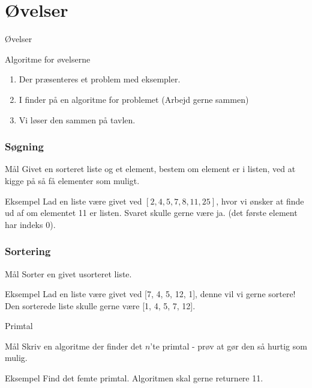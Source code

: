 \documentclass[12pt,t]{beamer}
\begin{document}
\section{Øvelser}
        \begin{frame}[t]{Øvelser}
            \begin{block}{Algoritme for øvelserne}
                \begin{enumerate}
                    \item Der præsenteres et problem med eksempler. \pause
                    \item I finder på en algoritme for problemet
                          (Arbejd gerne sammen) \pause
                    \item Vi løser den sammen på tavlen.
                \end{enumerate}
            \end{block}
        \end{frame}

    \begin{frame}
      \frametitle{Søgning}
      \begin{block}{Mål}
      Givet en sorteret liste og et element, bestem om element er i listen,
      ved at kigge på så få elementer som muligt.
      \end{block}
      \pause

      \begin{exampleblock}{Eksempel}
      Lad en liste være givet ved $[2, 4, 5, 7, 8, 11, 25]$, hvor vi ønsker at
      finde ud af om elementet 11 er listen. Svaret skulle gerne være ja.
      (det første element har indeks 0).
      \end{exampleblock}
    \end{frame}

    \begin{frame}
      \frametitle{Sortering}
      \begin{block}{Mål}
      Sorter en givet usorteret liste.
      \end{block}
      \pause

      \begin{exampleblock}{Eksempel}
      Lad en liste være givet ved [7, 4, 5, 12, 1], denne vil vi gerne sortere!
      Den sorterede liste skulle gerne være [1, 4, 5, 7, 12].
      \end{exampleblock}
    \end{frame}

    \begin{frame}{Primtal}
      \begin{block}{Mål}
      Skriv en algoritme der finder det $n$'te primtal - prøv at gør den så
      hurtig som mulig.
      \end{block}
      \pause

      \begin{exampleblock}{Eksempel}
      Find det femte primtal. Algoritmen skal gerne returnere 11.
      \end{exampleblock}
    \end{frame}
\end{document}

